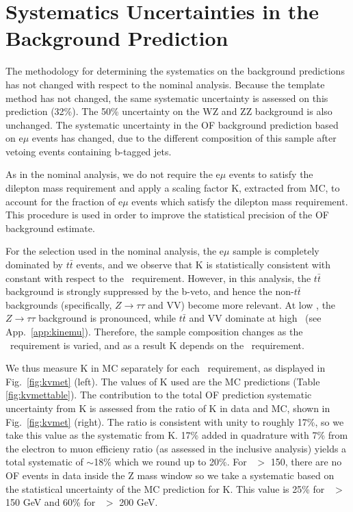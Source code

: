 \section{Systematics Uncertainties in the Background Prediction}
\label{sec:systematics}

The methodology for determining the systematics on the background
predictions has not changed with respect to the nominal analysis.
Because the template method has not changed, the same 
systematic uncertainty is assessed on this prediction (32\%).
The 50\% uncertainty on the WZ and ZZ background is also unchanged.
The systematic uncertainty in the OF background prediction based on 
e$\mu$ events has changed, due to the different composition of this
sample after vetoing events containing b-tagged jets.

As in the nominal analysis, we do not require the e$\mu$ events
to satisfy the dilepton mass requirement and apply a scaling factor K,
extracted from MC, to account for the fraction of e$\mu$ events
which satisfy the dilepton mass requirement. This procedure is used
in order to improve the statistical precision of the OF background estimate.

For the selection used in the nominal analysis, 
the e$\mu$ sample is completely dominated by $t\bar{t}$
events, and we observe that K is statistically consistent with constant with
respect to the \MET\ requirement. However, in this analysis, the $t\bar{t}$
background is strongly suppressed by the b-veto, and hence the non-$t\bar{t}$
backgrounds (specifically, $Z\to\tau\tau$ and VV) become more relevant. 
At low \MET, the $Z\to\tau\tau$ background is pronounced, while $t\bar{t}$
and VV dominate at high \MET\ (see App.~\ref{app:kinemu}).
Therefore, the sample composition changes
as the \MET\ requirement is varied, and as a result K depends
on the \MET\ requirement. 

We thus measure K in MC separately for each
\MET\ requirement, as displayed in Fig.~\ref{fig:kvmet} (left).
The values of K used are the MC predictions 
(Table \ref{fig:kvmettable}).
The contribution to the total OF prediction systematic uncertainty 
from K is assessed from the ratio of K in data and MC,
shown in Fig.~\ref{fig:kvmet} (right).
The ratio is consistent with unity to roughly 17\%, 
so we take this value as the systematic from K.
17\% added in quadrature with 7\% from 
the electron to muon efficieny ratio 
(as assessed in the inclusive analysis)
yields a total systematic of $\sim$18\% 
which we round up to 20\%.
For \MET\ $>$ 150, there are no OF events in data inside the Z mass window
so we take a systematic based on the statistical uncertainty
of the MC prediction for K. 
This value is 25\% for \MET\ $>$ 150 GeV and 60\% for \MET\ $>$ 200 GeV.


